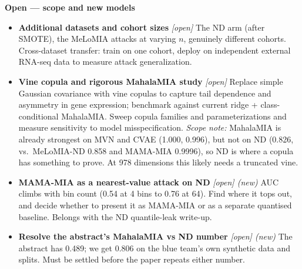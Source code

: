 \noindent\textbf{Open --- scope and new models}
\begin{itemize}
\item \textbf{Additional datasets and cohort sizes} \emph{[open]} The ND arm (after SMOTE), the MeLoMIA attacks at varying $n$, genuinely different cohorts. Cross-dataset transfer: train on one cohort, deploy on independent external RNA-seq data to measure attack generalization.
\item \textbf{Vine copula and rigorous MahalaMIA study} \emph{[open]} Replace simple Gaussian covariance with vine copulas to capture tail dependence and asymmetry in gene expression; benchmark against current ridge + class-conditional MahalaMIA. Sweep copula families and parameterizations and measure sensitivity to model misspecification. \emph{Scope note:} MahalaMIA is already strongest on MVN and CVAE (1.000, 0.996), but not on ND (0.826, vs.\ MeLoMIA-ND 0.858 and MAMA-MIA 0.9996), so ND is where a copula has something to prove. At 978 dimensions this likely needs a truncated vine.
\item \textbf{MAMA-MIA as a nearest-value attack on ND} \emph{[open] (new)} AUC climbs with bin count (0.54 at 4 bins to 0.76 at 64). Find where it tops out, and decide whether to present it as MAMA-MIA or as a separate quantised baseline. Belongs with the ND quantile-leak write-up.
\item \textbf{Resolve the abstract's MahalaMIA vs ND number} \emph{[open] (new)} The abstract has 0.489; we get 0.806 on the blue team's own synthetic data and splits. Must be settled before the paper repeats either number.
\end{itemize}
